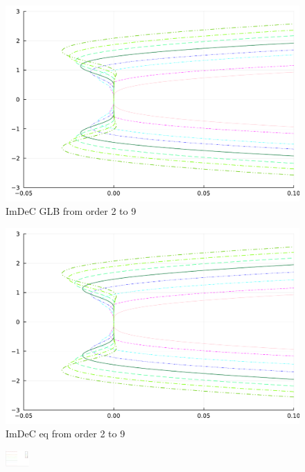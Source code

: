 \begin{figure}
	\centering 
	\begin{minipage}[t]{0.45\textwidth}
		\includegraphics[width=\textwidth]{pdf/odepics/IMEXDeC_gaussLobatto_zoom.pdf}
		\centering
		ImDeC GLB from order 2 to 9
	\end{minipage}
	\begin{minipage}[t]{0.45\textwidth}
		\includegraphics[width=\textwidth]{pdf/odepics/IMEXDeC_equispaced_zoom.pdf}
		\centering
		ImDeC eq from order 2 to 9
	\end{minipage}
	\includegraphics[width=0.08\textwidth, trim={491 140 30 23}, clip]{pdf/odepics/colors_a-d_new_2-13_no_order.pdf}\\	
	\begin{minipage}[t]{0.45\textwidth}

\end{minipage}
\end{figure}
